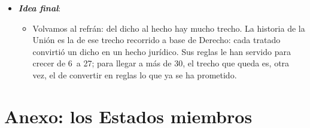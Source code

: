 \documentclass[11pt]{article}
\begin{document}
\begin{itemize}
\begin{itemize}
  \item Con las reglas actuales arriesga la parálisis; esperar a una reforma de los Tratados, no hacerla nunca. Lo realista es lo empezado en 2026: pasarelas, cooperación reforzada y salvaguardias de los valores, y la reforma completa, después.
  \end{itemize}
\item \textbf{\emph{Idea final}}:
  \begin{itemize}
  \item Volvamos al refrán: del dicho al hecho hay mucho trecho. La historia de la Unión es la de ese trecho recorrido a base de Derecho: cada tratado convirtió un dicho en un hecho jurídico. Sus reglas le han servido para crecer de 6~a 27; para llegar a más de 30, el trecho que queda es, otra vez, el de convertir en reglas lo que ya se ha prometido.
  \end{itemize}
\end{itemize}

\clearpage
\appendix

\section{Anexo: los Estados miembros}\label{anexo:estados}
\end{document}
